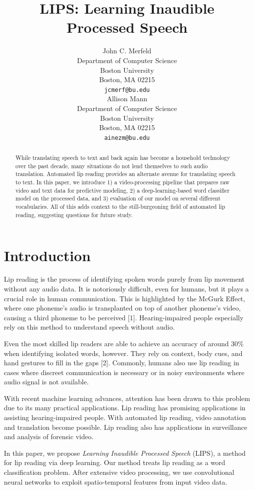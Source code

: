 \documentclass{article}
\title{LIPS: Learning Inaudible Processed Speech}
\author{%
  John C. Merfeld \\
  Department of Computer Science\\
  Boston University\\
  Boston, MA 02215 \\
  \texttt{jcmerf@bu.edu} \\
	\And
  Allison Mann \\
  Department of Computer Science\\
  Boston University\\
  Boston, MA 02215 \\
  \texttt{ainezm@bu.edu} \\
}
\begin{document}
\maketitle

\begin{abstract}
While translating speech to text and back again has become a household technology over the past decade, many situations do not lend themselves to such audio translation. Automated lip reading provides an alternate avenue for translating speech to text. In this paper, we introduce 1) a video-processing pipeline that prepares raw video and text data for predictive modeling, 2) a deep-learning-based word classifier model on the processed data, and 3) evaluation of our model on several different vocabularies. All of this adds context to the still-burgeoning field of automated lip reading, suggesting questions for future study.
\end{abstract}

\section{Introduction}

Lip reading is the process of identifying spoken words purely from lip movement without any audio data. It is notoriously difficult, even for humans, but it plays a crucial role in human communication. This is highlighted by the McGurk Effect, where one phoneme's audio is transplanted on top of another phoneme's video, causing a third phoneme to be perceived [1]. Hearing-impaired people especially rely on this method to understand speech without audio. 

Even the most skilled lip readers are able to achieve an accuracy of around 30\% when identifying isolated words, however. They rely on context, body cues, and hand gestures to fill in the gaps [2]. Commonly, humans also use lip reading in cases where discreet communication is necessary or in noisy environments where audio signal is not available.

With recent machine learning advances, attention has been drawn to this problem due to its many practical applications. Lip reading has promising applications in assisting hearing-impaired people. With automated lip reading, video annotation and translation become possible. Lip reading also has applications in surveillance and analysis of forensic video.

In this paper, we propose \textit{Learning Inaudible Processed Speech} (LIPS), a method for lip reading via deep learning. Our method treats lip reading as a word classification problem. After extensive video processing, we use convolutional neural networks to exploit spatio-temporal features from input video data.
\end{document}
